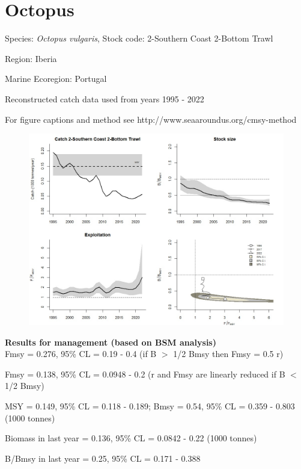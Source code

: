 \documentclass[12pt,a4paper]{article}\usepackage[]{graphicx}\usepackage[]{xcolor}
\begin{document}
    \section*{Octopus}


    Species: \emph{Octopus vulgaris}, Stock code: 2-Southern Coast 2-Bottom Trawl

Region: Iberia

Marine Ecoregion: Portugal

Reconstructed catch data used from years 1995 - 2022 

 For figure captions and method see http://www.seaaroundus.org/cmsy-method

    \begin{figure}[ht]
    \centering
    \includegraphics[width=1.00\textwidth ext=.jpg type=jpg]{2-Southern Coast 2-Bottom Trawl_MAN.jpg}
    \end{figure}

    \textbf{Results for management (based on BSM analysis)}\\

Fmsy = 0.276, 95\% CL = 0.19 - 0.4 (if B $>$ 1/2 Bmsy then Fmsy = 0.5 r)

Fmsy = 0.138, 95\% CL = 0.0948 - 0.2 (r and Fmsy are linearly reduced if B $<$ 1/2 Bmsy)

MSY = 0.149,  95\% CL = 0.118 - 0.189; Bmsy = 0.54,  95\% CL = 0.359 - 0.803 (1000 tonnes)

Biomass in last year = 0.136, 95\% CL = 0.0842 - 0.22 (1000 tonnes)

B/Bmsy in last year = 0.25, 95\% CL = 0.171 - 0.388
\end{document}
